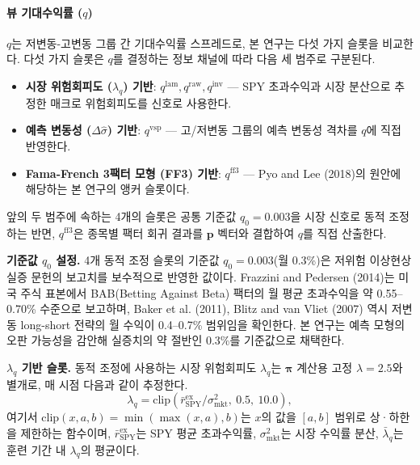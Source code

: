 \documentclass{article}
\begin{document}
\paragraph{뷰 기대수익률 ($q$)}

$q$는 저변동-고변동 그룹 간 기대수익률 스프레드로, 본 연구는 다섯 가지 슬롯을 비교한다. 다섯 가지 슬롯은 $q$를 결정하는 정보 채널에 따라 다음 세 범주로 구분된다.

\begin{itemize}
  \item \textbf{시장 위험회피도 ($\lambda_q$) 기반}: $q^{\mathrm{lam}}, q^{\mathrm{raw}}, q^{\mathrm{inv}}$ --- SPY 초과수익과 시장 분산으로 추정한 매크로 위험회피도를 신호로 사용한다.
  \item \textbf{예측 변동성 ($\Delta\hat{\sigma}$) 기반}: $q^{\mathrm{vsp}}$ --- 고/저변동 그룹의 예측 변동성 격차를 $q$에 직접 반영한다.
  \item \textbf{Fama-French 3팩터 모형 (FF3) 기반}: $q^{\mathrm{ff3}}$ --- Pyo and Lee (2018)의 원안에 해당하는 본 연구의 앵커 슬롯이다.
\end{itemize}

앞의 두 범주에 속하는 4개의 슬롯은 공통 기준값 $q_0 = 0.003$을 시장 신호로 동적 조정하는 반면, $q^{\mathrm{ff3}}$은 종목별 팩터 회귀 결과를 $\mathbf{p}$ 벡터와 결합하여 $q$를 직접 산출한다.

\textbf{기준값 $q_0$ 설정.} 4개 동적 조정 슬롯의 기준값 $q_0 = 0.003$(월 0.3\%)은 저위험 이상현상 실증 문헌의 보고치를 보수적으로 반영한 값이다. Frazzini and Pedersen (2014)는 미국 주식 표본에서 BAB(Betting Against Beta) 팩터의 월 평균 초과수익을 약 0.55--0.70\% 수준으로 보고하며, Baker et al. (2011), Blitz and van Vliet (2007) 역시 저변동 long-short 전략의 월 수익이 0.4--0.7\% 범위임을 확인한다. 본 연구는 예측 모형의 오판 가능성을 감안해 실증치의 약 절반인 0.3\%를 기준값으로 채택한다.

\textbf{$\lambda_q$ 기반 슬롯.} 동적 조정에 사용하는 시장 위험회피도 $\lambda_q$는 $\boldsymbol{\pi}$ 계산용 고정 $\lambda = 2.5$와 별개로, 매 시점 다음과 같이 추정한다.
\begin{equation}
  \lambda_q = \mathrm{clip}\!\left(\bar{r}^{\mathrm{ex}}_{\mathrm{SPY}}/\sigma^2_{\mathrm{mkt}},\ 0.5,\ 10.0\right),
\end{equation}
여기서 $\mathrm{clip}(x, a, b) = \min(\max(x, a), b)$는 $x$의 값을 $[a, b]$ 범위로 상·하한을 제한하는 함수이며, $\bar{r}^{\mathrm{ex}}_{\mathrm{SPY}}$는 SPY 평균 초과수익률, $\sigma^2_{\mathrm{mkt}}$는 시장 수익률 분산, $\bar{\lambda}_q$는 훈련 기간 내 $\lambda_q$의 평균이다.
\end{document}
